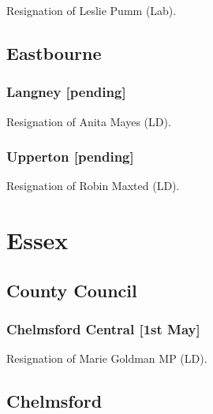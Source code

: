 \documentclass[a4paper,openany]{book}
\begin{document}
\begin{resultsiii}
Resignation of Leslie Pumm (Lab).

\subsection*{Eastbourne}

\subsubsection*{Langney \hspace*{\fill}\nolinebreak[1]%
	\enspace\hspace*{\fill}
	[pending]}


Resignation of Anita Mayes (LD).

\subsubsection*{Upperton \hspace*{\fill}\nolinebreak[1]%
	\enspace\hspace*{\fill}
	[pending]}


Resignation of Robin Maxted (LD).

\section{Essex}

\subsection*{County Council}

\subsubsection*{Chelmsford Central \hspace*{\fill}\nolinebreak[1]%
	\enspace\hspace*{\fill}
	[1st May]}


Resignation of Marie Goldman MP (LD).

\subsection*{Chelmsford}


\end{resultsiii}
\end{document}
